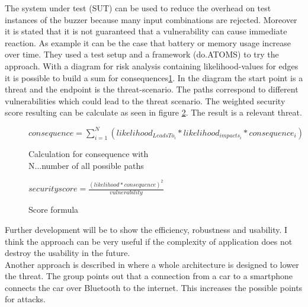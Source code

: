 \documentclass[12pt,a4paper]{article}
\begin{document}
The system under test (SUT) can be used to reduce the overhead on test instances of the buzzer because many input combinations are rejected. Moreover it is stated that it is not guaranteed that a vulnerability can cause immediate reaction. As example it can be the case that battery or memory usage increase over time. They used a test setup and a framework (do.ATOMS) to try the approach. With a diagram for risk analysis containing likelihood-values for edges it is possible to build a sum for consequences\ref{consequences_formula}. In the diagram the start point is a threat and the endpoint is the threat-scenario. The paths correspond to different vulnerabilities which could lead to the threat scenario. 
The weighted security score resulting can be calculate as seen in figure \ref{security_formula}. The result is a relevant threat.

\begin{figure}[h]
\begin{center}
\begin{math}
consequence = \sum_{i=1}^{N} (likelihood_{LeadsTo_i} * likelihood_{impacts_i} * consequence_i)
\end{math}
\caption{Calculation for consequence with\\ N...number of all possible paths \cite{DBLP:conf/automotiveSS/JakobKSGMSF12} }
\label{consequences_formula}
\end{center}
\end{figure}

\begin{figure}[h]
\begin{center}
\begin{math}
	security score = \frac{(likelihood * consequence)^2}{vulnerability}
\end{math}
\caption{Score formula \cite{DBLP:conf/automotiveSS/JakobKSGMSF12}}
\label{security_formula}
\end{center}
\end{figure}
Further development will be to show the efficiency, robustness and usability.
I think the approach can be very useful if the complexity of application does not destroy the usability in the future.\\

Another approach is described in \cite{DBLP:journals/esl/DardanelliMTZSKH13} where a whole architecture is designed to lower the threat. The group points out that a connection from a car to a smartphone connects the car over Bluetooth to the internet. This increases the possible points for attacks.\\
\end{document}
